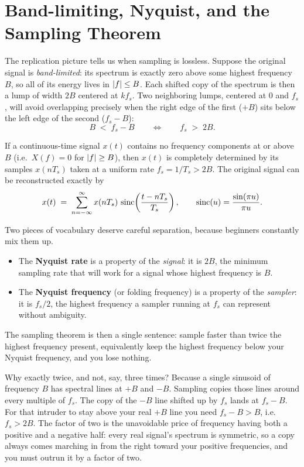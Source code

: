 \section{Band-limiting, Nyquist, and the Sampling Theorem}
\label{ch18:sampling-theorem}

The replication picture tells us when sampling is lossless. Suppose the
original signal is \emph{band-limited}: its spectrum is exactly zero above some
highest frequency $B$, so all of its energy lives in $\lvert f\rvert \le B$. Each shifted
copy of the spectrum is then a lump of width $2B$ centered at $kf_s$. Two neighboring
lumps, centered at $0$ and $f_s$, will avoid overlapping precisely when the right edge
of the first ($+B$) sits below the left edge of the second ($f_s - B$):
\[
  B \;<\; f_s - B \qquad\Longleftrightarrow\qquad f_s \;>\; 2B .
\]

\begin{theorem}
\label{ch18:thm-sampling}
If a continuous-time signal $x(t)$ contains no frequency components at or above $B$
(i.e.\ $X(f)=0$ for $\lvert f\rvert\ge B$), then $x(t)$ is completely determined by its
samples $x(nT_s)$ taken at a uniform rate $f_s = 1/T_s > 2B$. The original signal can
be reconstructed exactly by
\[
  x(t) \;=\; \sum_{n=-\infty}^{\infty} x(nT_s)\,
             \operatorname{sinc}\!\left(\frac{t - nT_s}{T_s}\right),
  \qquad
  \operatorname{sinc}(u) = \frac{\sin(\pi u)}{\pi u}.
\]
\end{theorem}

Two pieces of vocabulary deserve careful separation, because beginners constantly mix
them up.

\begin{itemize}
\item The \textbf{Nyquist rate} is a property of the \emph{signal}: it is $2B$, the
      minimum sampling rate that will work for a signal whose highest frequency is $B$.
\item The \textbf{Nyquist frequency} (or folding frequency) is a property of the
      \emph{sampler}: it is $f_s/2$, the highest frequency a sampler running at $f_s$
      can represent without ambiguity.
\end{itemize}

The sampling theorem is then a single sentence: sample faster than twice the highest
frequency present, equivalently keep the highest frequency below your Nyquist
frequency, and you lose nothing.

\begin{whybox}
Why exactly twice, and not, say, three times? Because a single sinusoid of frequency
$B$ has spectral lines at $+B$ and $-B$. Sampling copies those lines around every
multiple of $f_s$. The copy of the $-B$ line shifted up by $f_s$ lands at $f_s - B$.
For that intruder to stay above your real $+B$ line you need $f_s - B > B$, i.e.\
$f_s > 2B$. The factor of two is the unavoidable price of frequency having both a
positive and a negative half: every real signal's spectrum is symmetric, so a copy
always comes marching in from the right toward your positive frequencies, and you must
outrun it by a factor of two.
\end{whybox}

